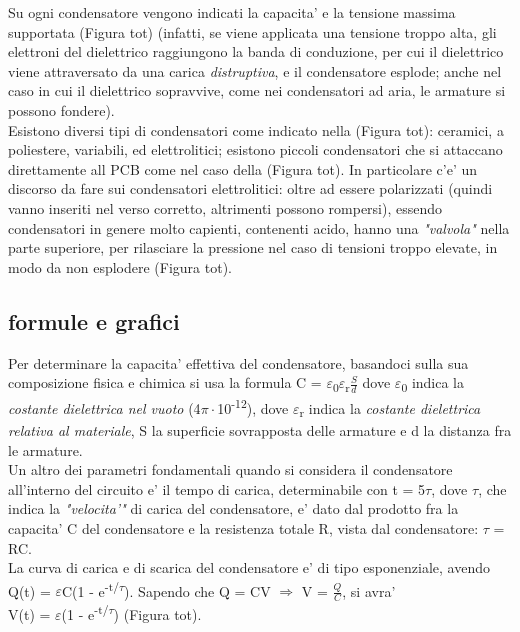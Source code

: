 \documentclass[12pt]{article}
\begin{document}
Su ogni condensatore vengono indicati la capacita' e la tensione 
massima supportata (Figura tot) (infatti, se viene applicata una tensione troppo alta, gli elettroni del dielettrico raggiungono la banda di conduzione, per cui il dielettrico viene attraversato da una carica \textit{distruptiva}, e il condensatore esplode; anche nel caso in cui il dielettrico
sopravvive, come nei condensatori ad aria, le armature si possono fondere). \\

Esistono diversi tipi di condensatori come indicato nella (Figura tot): ceramici, a poliestere, variabili, ed elettrolitici; esistono piccoli condensatori che si attaccano direttamente all PCB
come nel caso della (Figura tot). In particolare c'e' un discorso da fare sui condensatori elettrolitici: oltre ad essere polarizzati (quindi vanno inseriti nel verso corretto, altrimenti possono rompersi), essendo condensatori in genere molto capienti, contenenti acido, hanno una \textit{"valvola"} nella parte superiore, per rilasciare la pressione nel caso di tensioni troppo elevate, in modo da non esplodere (Figura tot).

\subsection*{formule e grafici}
Per determinare la capacita' effettiva del condensatore, basandoci sulla sua composizione fisica e chimica si usa la formula 
C = $\varepsilon$\textsubscript{0}$\varepsilon$\textsubscript{r}$\frac{S}{d}$
dove $\varepsilon$\textsubscript{0} indica la 
\textit{costante dielettrica nel vuoto} (4$\pi\cdot$10\textsuperscript{-12}),
dove $\varepsilon$\textsubscript{r} indica la \textit{costante dielettrica relativa al materiale},
S la superficie sovrapposta delle armature e d la distanza fra le armature. \\

Un altro dei parametri fondamentali quando si considera il condensatore all'interno
del circuito e' il tempo di carica, determinabile con t = 5$\tau$, dove $\tau$, 
che indica la \textit{"velocita'"} di carica del condensatore, e' dato dal prodotto fra 
la capacita' C del condensatore e la resistenza totale R, vista dal condensatore: $\tau$ = RC. \\

La curva di carica e di scarica del condensatore e' di tipo esponenziale, avendo
Q(t) = $\varepsilon$C(1 - e\textsuperscript{-t/$\tau$}).
Sapendo che Q = CV $\Rightarrow$ V = $\frac{Q}{C}$, si avra' \\
V(t) = $\varepsilon$(1 - e\textsuperscript{-t/$\tau$}) (Figura tot). \\
\end{document}
